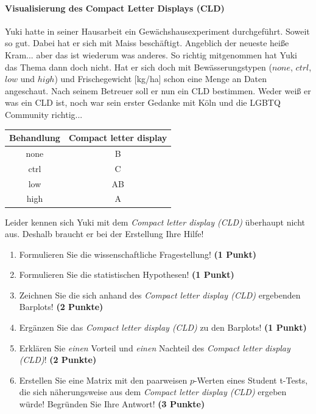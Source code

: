 \documentclass[a4paper, 9pt]{scrartcl}\usepackage[]{graphicx}\usepackage[]{xcolor}
\newenvironment{knitrout}{}{} %
\begin{document}
\ifcollection
\paragraph{Visualisierung des Compact Letter Displays (CLD)}
\fi

Yuki hatte in seiner Hausarbeit ein Gewächshausexperiment durchgeführt. Soweit so gut. Dabei hat er sich mit Maiss beschäftigt. Angeblich der neueste heiße Kram... aber das ist wiederum was anderes. So richtig mitgenommen hat Yuki das Thema dann doch nicht. Hat er sich doch mit Bewässerungstypen ($none$, $ctrl$, $low$ und $high$) und Frischegewicht [kg/ha] schon eine Menge an Daten angeschaut. Nach seinem Betreuer soll er nun ein CLD bestimmen. Weder weiß er was ein CLD ist, noch war sein erster Gedanke mit Köln und die LGBTQ Community richtig...

\begin{knitrout}
\color{fgcolor}\begin{table}[!h]
\centering\begingroup\fontsize{10}{12}\selectfont

\begin{tabular}{cc}
\toprule
\textbf{Behandlung} & \textbf{Compact letter display}\\
\midrule
none & B\\
ctrl & C\\
low & AB\\
high & A\\
\bottomrule
\end{tabular}
\endgroup{}
\end{table}

\end{knitrout}

Leider kennen sich Yuki mit dem \textit{Compact letter display (CLD)} überhaupt nicht aus. Deshalb braucht er bei der Erstellung Ihre Hilfe!

\begin{enumerate}
  \item Formulieren Sie die wissenschaftliche Fragestellung! \textbf{(1 Punkt)}
  \item Formulieren Sie die statistischen Hypothesen! \textbf{(1 Punkt)}
\item Zeichnen Sie die sich anhand des \textit{Compact letter display (CLD)} ergebenden Barplots! \textbf{(2 Punkte)}
\item Ergänzen Sie das \textit{Compact letter display (CLD)} zu den Barplots! \textbf{(1 Punkt)}
\item Erklären Sie \textit{einen} Vorteil und \textit{einen} Nachteil des \textit{Compact letter display (CLD)}! \textbf{(2 Punkte)}
\item Erstellen Sie eine Matrix mit den paarweisen $p$-Werten eines Student t-Tests, die sich näherungsweise aus dem \textit{Compact letter display (CLD)} ergeben würde! Begründen Sie Ihre Antwort! \textbf{(3 Punkte)}
\end{enumerate}
\end{document}
